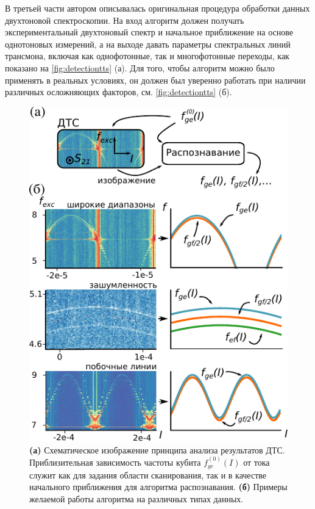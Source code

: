 \documentclass[14pt, a4paper]{extarticle}
\begin{document}
В третьей части автором описывалась оригинальная процедура обработки данных двухтоновой спектроскопии. На вход алгоритм должен получать экспериментальный двухтоновый спектр и начальное приближение на основе однотоновых измерений, а на выходе давать параметры спектральных линий трансмона, включая как однофотонные, так и многофотонные переходы, как показано на \autoref{fig:detectiontts} (а). Для того, чтобы алгоритм можно было применять в реальных условиях, он должен был уверенно работать при наличии различных осложняющих факторов, см. \autoref{fig:detectiontts} (б).
	

\begin{figure}[t]
	\centering
	\includegraphics[width=0.6\linewidth]{Pictures/detection_tts}
	\caption{\textbf{(а)} Схематическое изображение принципа анализа результатов ДТС. Приблизительная зависимость частоты кубита $f_{ge}^{(0)}(I)$ от тока служит как для задания области сканирования, так и в качестве начального приближения для алгоритма распознавания. \textbf{(б)} Примеры желаемой работы алгоритма на различных типах данных.}
	\label{fig:detectiontts}
\end{figure}
\end{document}
